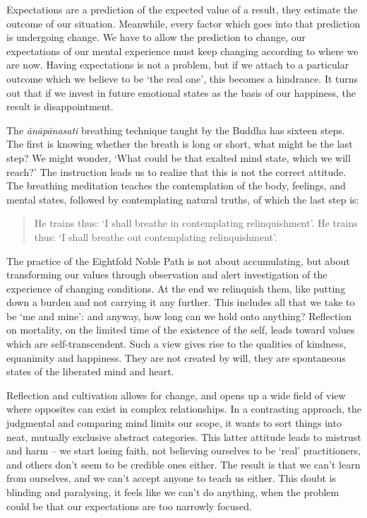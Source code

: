 Expectations are a prediction of the expected value of a result, they
estimate the outcome of our situation. Meanwhile, every factor which
goes into that prediction is undergoing change. We have to allow the
prediction to change, our expectations of our mental experience must
keep changing according to where we are now. Having expectations is not
a problem, but if we attach to a particular outcome which we believe to
be `the real one', this becomes a hindrance. It turns out that if we
invest in future emotional states as the basis of our happiness, the
result is disappointment.

The \emph{ānāpānasati} breathing technique taught by the Buddha has
sixteen steps. The first is knowing whether the breath is long or short,
what might be the last step? We might wonder, `What could be that
exalted mind state, which we will reach?' The instruction leads us to
realize that this is not the correct attitude. The breathing meditation
teaches the contemplation of the body, feelings, and mental states,
followed by contemplating natural truths, of which the last step is:

\begin{quote}
He trains thus: `I shall breathe in contemplating relinquishment'. He
trains thus: `I shall breathe out contemplating relinquishment'.

\bigskip

\end{quote}

The practice of the Eightfold Noble Path is not about accumulating, but
about transforming our values through observation and alert
investigation of the experience of changing conditions. At the end we
relinquish them, like putting down a burden and not carrying it any
further. This includes all that we take to be `me and mine': and anyway,
how long can we hold onto anything? Reflection on mortality, on the
limited time of the existence of the self, leads toward values which are
self-transcendent. Such a view gives rise to the qualities of kindness,
equanimity and happiness. They are not created by will, they are
spontaneous states of the liberated mind and heart.


Reflection and cultivation allows for change, and opens up a wide field
of view where opposites can exist in complex relationships. In a
contrasting approach, the judgmental and comparing mind limits our
scope, it wants to sort things into neat, mutually exclusive abstract
categories. This latter attitude leads to mistrust and harm -- we start
losing faith, not believing ourselves to be `real' practitioners, and
others don't seem to be credible ones either. The result is that we
can't learn from ourselves, and we can't accept anyone to teach us
either. This doubt is blinding and paralysing, it feels like we can't do
anything, when the problem could be that our expectations are too
narrowly focused.


